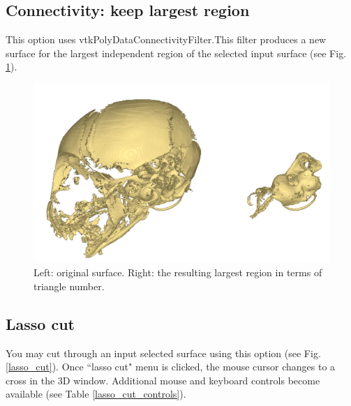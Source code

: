 \subsection{Connectivity: keep largest region}
This option uses vtkPolyDataConnectivityFilter.This filter produces a new surface for the largest independent region of the selected input surface (see Fig. \ref{largest_region}).

\begin{figure}
  \centering
  \includegraphics[scale=0.4]{images/Edit_selected_objects/03_Decompose6.png} 
	\caption{Left: original surface. Right: the resulting largest region in terms of triangle number.}
\label{largest_region}
 
\end{figure}


\subsection{Lasso cut}\label{lasso_cut_section}
You may cut through an input selected surface using this option (see Fig. \ref{lasso_cut}). Once ``lasso cut" menu is clicked, the mouse cursor changes to a cross in the 3D window. Additional mouse and keyboard controls become available (see Table \ref{lasso_cut_controls}).

